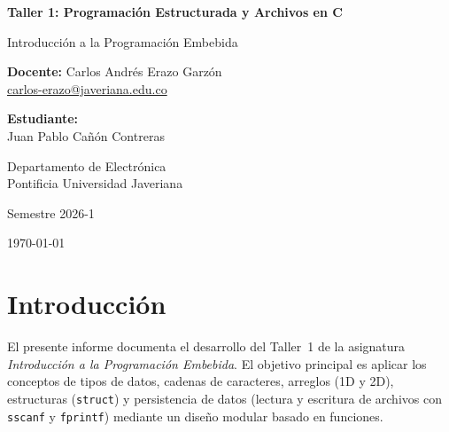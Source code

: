 \documentclass[12pt, letterpaper]{article}
\begin{document}
\begin{titlepage}
    \centering
    \vspace*{2cm}

    {\Huge\bfseries Taller 1: Programación Estructurada y Archivos en C\par}
    \vspace{1.5cm}

    {\Large Introducción a la Programación Embebida\par}
    \vspace{2cm}

    {\large\textbf{Docente:} Carlos Andrés Erazo Garzón\\
    \href{mailto:carlos-erazo@javeriana.edu.co}{carlos-erazo@javeriana.edu.co}\par}
    \vspace{2cm}

    {\large\textbf{Estudiante:}\\[0.3cm]
    Juan Pablo Cañón Contreras\par}
    \vspace{2cm}

    {\large Departamento de Electrónica\\
    Pontificia Universidad Javeriana\par}
    \vspace{1cm}

    {\large Semestre 2026-1\par}

    \vfill
    {\large \today\par}
\end{titlepage}

\tableofcontents
\newpage

\section{Introducción}

El presente informe documenta el desarrollo del Taller~1 de la asignatura
\textit{Introducción a la Programación Embebida}. El objetivo principal es
aplicar los conceptos de tipos de datos, cadenas de caracteres, arreglos (1D y
2D), estructuras (\texttt{struct}) y persistencia de datos (lectura y escritura
de archivos con \texttt{sscanf} y \texttt{fprintf}) mediante un diseño modular
basado en funciones.
\end{document}
